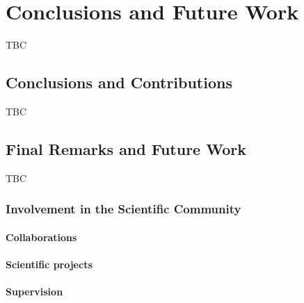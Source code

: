 \chapter{Conclusions and Future Work}\label{chap:conclusions}

TBC

\section{Conclusions and Contributions}

TBC

\section{Final Remarks and Future Work}

TBC

\subsection{Involvement in the Scientific Community}\label{sec:conclusions:community}
\subsubsection{Collaborations}
\subsubsection{Scientific projects}
\subsubsection{Supervision}
